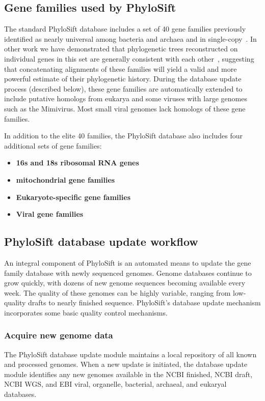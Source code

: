 \documentclass[10pt]{article}
\begin{document}
\subsection*{Gene families used by PhyloSift}

The standard PhyloSift database includes a set of 40 gene families previously identified as nearly universal among bacteria and archaea and in single-copy~\cite{Wu2012}.
In other work we have demonstrated that phylogenetic trees reconstructed on individual genes in this set are generally consistent with each other~\cite{Lang2012}, suggesting that concatenating alignments of these families will yield a valid and more powerful estimate of their phylogenetic history.
During the database update process (described below), these gene families are automatically extended to include putative homologs from eukarya and some viruses with large genomes such as the Mimivirus.
Most small viral genomes lack homologs of these gene families.

In addition to the elite 40 families, the PhyloSift database also includes four additional sets of gene families:
\begin{itemize}
\item \textbf{16s and 18s ribosomal RNA genes}
\item \textbf{mitochondrial gene families}
\item \textbf{Eukaryote-specific gene families}
\item \textbf{Viral gene families}
\end{itemize}

\subsection*{PhyloSift database update workflow}\label{sec:dbupdate}
An integral component of PhyloSift is an automated means to update the gene family database with newly sequenced genomes.
Genome databases continue to grow quickly, with dozens of new genome sequences becoming available every week.
The quality of these genomes can be highly variable, ranging from low-quality drafts to nearly finished sequence.
PhyloSift's database update mechanism incorporates some basic quality control mechanisms.
\subsubsection*{Acquire new genome data}
The PhyloSift database update module maintains a local repository of all known and processed genomes.
When a new update is initiated, the database update module identifies any new genomes available in the NCBI finished, NCBI draft, NCBI WGS, and EBI viral, organelle, bacterial, archaeal, and eukaryal databases. 
\end{document}
